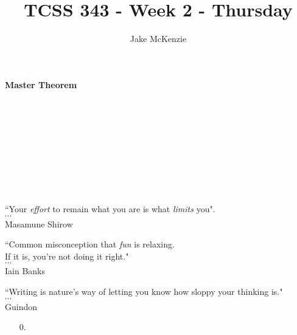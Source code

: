 \documentclass[12pt]{article}
\begin{document}
\title{TCSS 343 - Week 2 - Thursday}
\author{Jake McKenzie}
\maketitle
\noindent\centerline{\textbf{Master Theorem}}\\\\\\\\\\\\\\\\
\begin{center}
    ``Your \textit{effort} to remain what you are is what \textit{limits} you". \\$\cdots$\\ Masamune Shirow
\end{center}
\begin{center}
    ``Common misconception that \textit{fun} is relaxing. \\If it is, you’re not doing it right." \\$\cdots$\\ Iain Banks
\end{center}
\begin{center}
    ``Writing is nature's way of letting you know how sloppy your thinking is." \\$\cdots$\\Guindon
\end{center}
\newpage
\begin{enumerate}
\item[0.]
\newpage 
\end{enumerate}
\end{document}

